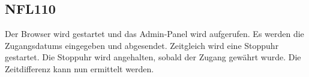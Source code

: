 \subsection*{NFL110}

Der \Gls{Browser} wird gestartet und das \Gls{Admin-Panel} wird aufgerufen.
Es werden die \Glspl{Zugangsdatum} eingegeben und abgesendet. Zeitgleich wird eine Stoppuhr gestartet.
Die Stoppuhr wird angehalten, sobald der Zugang gewährt wurde.
Die Zeitdifferenz kann nun ermittelt werden.